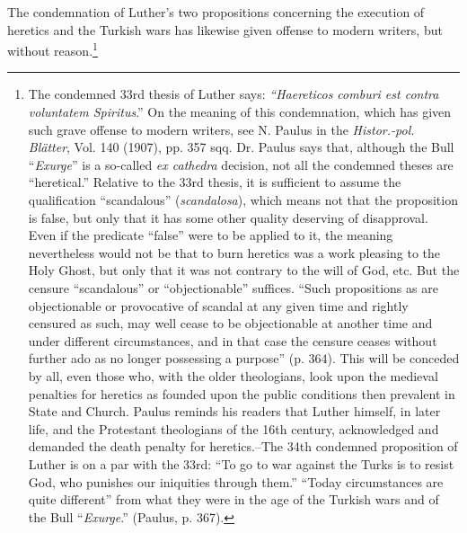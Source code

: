 The condemnation of Luther’s two propositions concerning the
execution of heretics and the Turkish wars has likewise given offense
to modern writers, but without reason.\footnote
{The condemned 33rd thesis of Luther says: \textit{``Haereticos comburi est contra voluntatem
Spiritus}.'' On the meaning of this condemnation, which has given such grave offense to
modern writers, see N. Paulus in the \textit{Histor.-pol. Blätter}, Vol. 140 (1907), pp. 357 sqq.
Dr. Paulus says that, although the Bull “\textit{Exurge}” is a so-called \textit{ex cathedra} decision, not all
the condemned theses are “heretical.” Relative to the 33rd thesis, it is sufficient to assume
the qualification “scandalous” (\textit{scandalosa}), which means not that the proposition is false,
but only that it has some other quality deserving of disapproval. Even if the predicate
“false” were to be applied to it, the meaning nevertheless would not be that to burn
heretics was a work pleasing to the Holy Ghost, but only that it was not contrary to the
will of God, etc. But the censure “scandalous” or “objectionable” suffices. “Such propositions
as are objectionable or provocative of scandal at any given time and rightly censured as such,
may well cease to be objectionable at another time and under different circumstances, and
in that case the censure ceases without further ado as no longer possessing a purpose”
(p. 364). This will be conceded by all, even those who, with the older theologians, look
upon the medieval penalties for heretics as founded upon the public conditions
then prevalent in State and Church. Paulus reminds his readers that Luther himself, in later life,
and the Protestant theologians of the 16th century, acknowledged and demanded the death
penalty for heretics.--The 34th condemned proposition of Luther is on a par with the
33rd: “To go to war against the Turks is to resist God, who punishes our iniquities
through them.” “Today circumstances are quite different” from what they were in the
age of the Turkish wars and of the Bull ``\textit{Exurge}.'' (Paulus, p. 367).}

